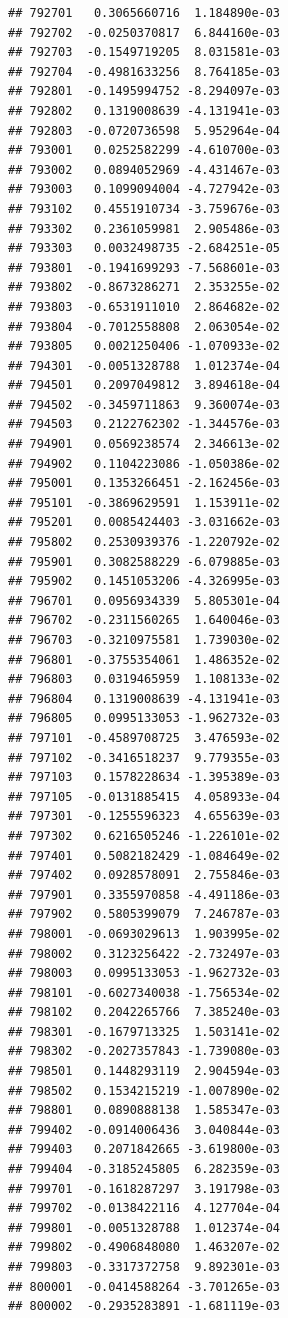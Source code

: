 \begin{frame}[fragile]
\begin{verbatim}
## 792701   0.3065660716  1.184890e-03
## 792702  -0.0250370817  6.844160e-03
## 792703  -0.1549719205  8.031581e-03
## 792704  -0.4981633256  8.764185e-03
## 792801  -0.1495994752 -8.294097e-03
## 792802   0.1319008639 -4.131941e-03
## 792803  -0.0720736598  5.952964e-04
## 793001   0.0252582299 -4.610700e-03
## 793002   0.0894052969 -4.431467e-03
## 793003   0.1099094004 -4.727942e-03
## 793102   0.4551910734 -3.759676e-03
## 793302   0.2361059981  2.905486e-03
## 793303   0.0032498735 -2.684251e-05
## 793801  -0.1941699293 -7.568601e-03
## 793802  -0.8673286271  2.353255e-02
## 793803  -0.6531911010  2.864682e-02
## 793804  -0.7012558808  2.063054e-02
## 793805   0.0021250406 -1.070933e-02
## 794301  -0.0051328788  1.012374e-04
## 794501   0.2097049812  3.894618e-04
## 794502  -0.3459711863  9.360074e-03
## 794503   0.2122762302 -1.344576e-03
## 794901   0.0569238574  2.346613e-02
## 794902   0.1104223086 -1.050386e-02
## 795001   0.1353266451 -2.162456e-03
## 795101  -0.3869629591  1.153911e-02
## 795201   0.0085424403 -3.031662e-03
## 795802   0.2530939376 -1.220792e-02
## 795901   0.3082588229 -6.079885e-03
## 795902   0.1451053206 -4.326995e-03
## 796701   0.0956934339  5.805301e-04
## 796702  -0.2311560265  1.640046e-03
## 796703  -0.3210975581  1.739030e-02
## 796801  -0.3755354061  1.486352e-02
## 796803   0.0319465959  1.108133e-02
## 796804   0.1319008639 -4.131941e-03
## 796805   0.0995133053 -1.962732e-03
## 797101  -0.4589708725  3.476593e-02
## 797102  -0.3416518237  9.779355e-03
## 797103   0.1578228634 -1.395389e-03
## 797105  -0.0131885415  4.058933e-04
## 797301  -0.1255596323  4.655639e-03
## 797302   0.6216505246 -1.226101e-02
## 797401   0.5082182429 -1.084649e-02
## 797402   0.0928578091  2.755846e-03
## 797901   0.3355970858 -4.491186e-03
## 797902   0.5805399079  7.246787e-03
## 798001  -0.0693029613  1.903995e-02
## 798002   0.3123256422 -2.732497e-03
## 798003   0.0995133053 -1.962732e-03
## 798101  -0.6027340038 -1.756534e-02
## 798102   0.2042265766  7.385240e-03
## 798301  -0.1679713325  1.503141e-02
## 798302  -0.2027357843 -1.739080e-03
## 798501   0.1448293119  2.904594e-03
## 798502   0.1534215219 -1.007890e-02
## 798801   0.0890888138  1.585347e-03
## 799402  -0.0914006436  3.040844e-03
## 799403   0.2071842665 -3.619800e-03
## 799404  -0.3185245805  6.282359e-03
## 799701  -0.1618287297  3.191798e-03
## 799702  -0.0138422116  4.127704e-04
## 799801  -0.0051328788  1.012374e-04
## 799802  -0.4906848080  1.463207e-02
## 799803  -0.3317372758  9.892301e-03
## 800001  -0.0414588264 -3.701265e-03
## 800002  -0.2935283891 -1.681119e-03

\end{verbatim}
\end{frame}
